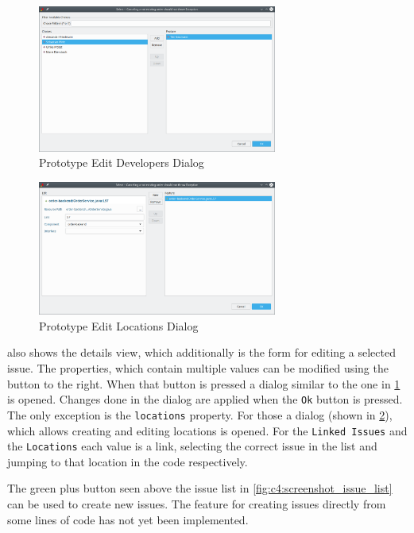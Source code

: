 \begin{figure}[!h]
	\centering
	\includegraphics[width=0.7\textwidth]{graphics/screenshot_gropius_ei_edit_list.png}
	\caption{Prototype Edit Developers Dialog}
	\label{fig:c4:screenshot_edit_list}
\end{figure}

\begin{figure}[!h]
	\centering
	\includegraphics[width=0.7\textwidth]{graphics/screenshot_gropius_ei_edit_locations.png}
	\caption{Prototype Edit Locations Dialog}
	\label{fig:c4:screenshot_edit_locations}
\end{figure}

 also shows the details view, which additionally is the form for editing a selected issue.
The properties, which contain multiple values can be modified using the button to the right.
When that button is pressed a dialog similar to the one in \cref{fig:c4:screenshot_edit_list} is opened.
Changes done in the dialog are applied when the \lstinline|Ok| button is pressed.
The only exception is the \lstinline|locations| property.
For those a dialog (shown in \cref{fig:c4:screenshot_edit_locations}), which allows creating and editing locations is opened.
For the \lstinline|Linked Issues| and the \lstinline|Locations| each value is a link, 
selecting the correct issue in the list and jumping to that location in the code respectively.

The green plus button seen above the issue list in \cref{fig:c4:screenshot_issue_list} can be used to create new issues.
The feature for creating issues directly from some lines of code has not yet been implemented.
